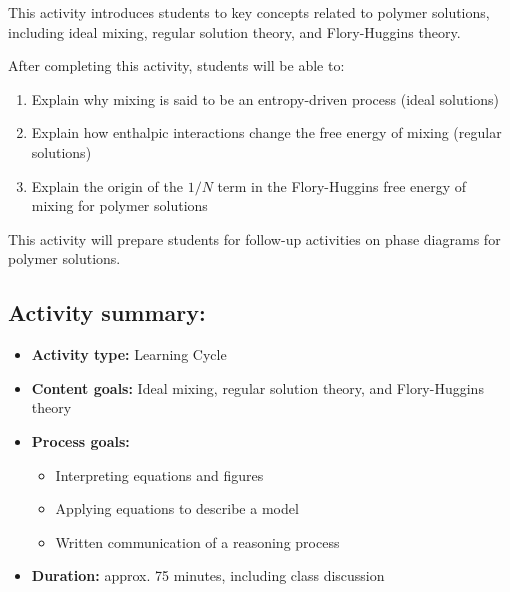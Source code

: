 %
%
%
%

\renewcommand{\figpath}{content/polymphys/solution-thermo/flory-huggins/figs}
\renewcommand{\labelbase}{flory-huggins}

\begin{activity}

\begin{instructornotes}

	This activity introduces students to key concepts related to polymer solutions, including ideal mixing, regular solution theory, and Flory-Huggins theory.
	
	After completing this activity, students will be able to:
			\begin{enumerate}
				\item Explain why mixing is said to be an entropy-driven process (ideal solutions)
				\item Explain how enthalpic interactions change the free energy of mixing (regular solutions)
				\item Explain the origin of the $1/N$ term in the Flory-Huggins free energy of mixing for polymer solutions
			\end{enumerate}
	This activity will prepare students for follow-up activities on phase diagrams for polymer solutions.
			
	\subsection*{Activity summary:}
	\begin{itemize}
		\item \textbf{Activity type:} Learning Cycle
		\item \textbf{Content goals:} Ideal mixing, regular solution theory, and Flory-Huggins theory
		\item \textbf{Process goals:} %
			\begin{itemize}
				\item Interpreting equations and figures
				\item Applying equations to describe a model
				\item Written communication of a reasoning process
			\end{itemize}
		\item \textbf{Duration:} approx. 75 minutes, including class discussion
		

\end{itemize}
\end{instructornotes}
\end{activity}
